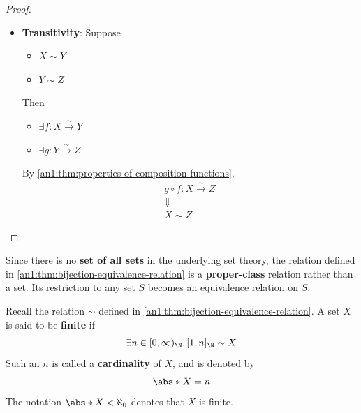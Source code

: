 \begin{proof}
\begin{itemize}
    \item \textbf{Transitivity}: Suppose
          \begin{itemize}
            \item $X \sim Y$
            \item $Y \sim Z$
          \end{itemize}
          Then
          \begin{itemize}
            \item $\exists f: X \xrightarrow{\sim} Y$
            \item $\exists g: Y \xrightarrow{\sim} Z$
          \end{itemize}
          By \cref{an1:thm:properties-of-composition-functions},
          \[
            \begin{array}{c}
              g \circ f: X \xrightarrow{\sim} Z \\
              \Downarrow                        \\
              X \sim Z
            \end{array}
          \]
  \end{itemize}
\end{proof}

\begin{remark}
  Since there is no \textbf{set of all sets} in the underlying set theory, the relation defined in
  \cref{an1:thm:bijection-equivalence-relation} is a \textbf{proper-class} relation rather than a set.
  Its restriction to any set $S$ becomes an equivalence relation on $S$.
\end{remark}

\begin{definition} \label{an1:def:finite-sets}
  Recall the relation $\sim$ defined in \cref{an1:thm:bijection-equivalence-relation}.
  A set $X$ is said to be \textbf{finite} if
  \[
    \exists n \in [0, \infty)_{\N}, [1, n]_{\N} \sim X
  \]
  Such an $n$ is called a \textbf{cardinality} of $X$, and is denoted by
  \[
    \abs*{X} = n
  \]
  The notation $\abs*{X} < \aleph_{0}$ denotes that $X$ is finite.
\end{definition}

